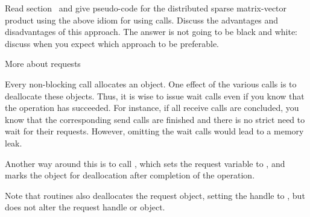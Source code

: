
\begin{exercise}
  Read section~ and give pseudo-code for the
    distributed sparse matrix-vector product using the above idiom for
    using  calls. Discuss the advantages and
    disadvantages of this approach. The answer is not going to be
    black and white: discuss when you expect which approach to be
    preferable.
\end{exercise}

 {More about requests}

Every non-blocking call allocates an 
object. One effect of the various  calls is
to deallocate these objects. Thus, it is wise to issue wait calls even
if you know that the operation has succeeded. For instance, if all
receive calls are concluded, you know that the corresponding send
calls are finished and there is no strict need to wait for their
requests. However, omitting the wait calls would lead to a memory
leak.

Another way around this is to call ,
which sets the request variable to ,
and marks the object for deallocation after completion of the
operation.

Note that  routines also deallocates the
request object, setting the handle to ,
but  does not alter the request
handle or object.



